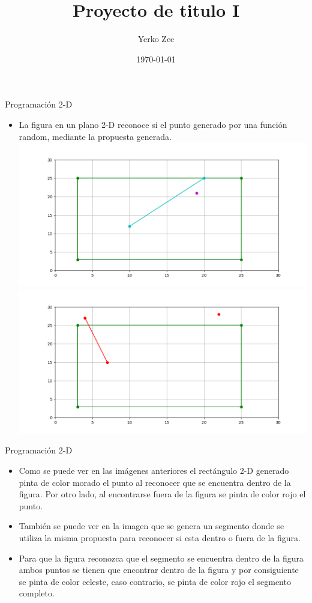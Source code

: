 \documentclass{beamer}
\title{Proyecto de titulo I}
\author{Yerko Zec}
\institute[]{FI - UNAB}
\date{\today}
\begin{document}
\begin{frame}[plain]
  \titlepage
\end{frame}

\addtocounter{framenumber}{-1}

\begin{frame}{Programación 2-D}
\begin{itemize}
    \item La figura en un plano 2-D reconoce si el punto generado por una función random, mediante la propuesta generada.
    \includegraphics[width = 0.6\linewidth]{Figure-2D}
    \includegraphics[width = 0.6\linewidth]{Figure_2D_fuera}
\end{itemize}
\end{frame}

\begin{frame}{Programación 2-D}
 \begin{itemize}
  \item Como se puede ver en las imágenes anteriores el rectángulo 2-D generado pinta de color morado el punto al reconocer que se encuentra dentro de la figura. Por otro lado, al encontrarse fuera de la figura se pinta de color rojo el punto.
  \item También se puede ver en la imagen que se genera un segmento donde se utiliza la misma propuesta para reconocer si esta dentro o fuera de la figura.
  \item Para que la figura reconozca que el segmento se encuentra dentro de la figura ambos puntos se tienen que encontrar dentro de la figura y por consiguiente se pinta de color celeste, caso contrario, se pinta de color rojo el segmento completo.
 \end{itemize}
\end{frame}
\end{document}
